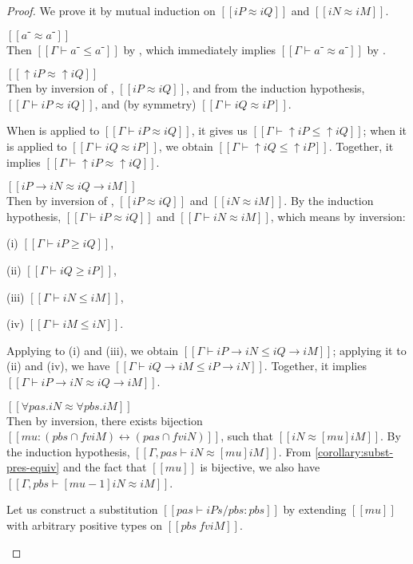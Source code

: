 \lemmaEquivSoundness*
\begin{proof}
  We prove it by mutual induction on $[[iP ≈ iQ]]$ and $[[iN ≈ iM]]$.
  \begin{caseof}
    \item $[[a⁻ ≈ a⁻]]$\\
      Then $[[Γ ⊢ a⁻ ≤ a⁻]]$ by ,
      which immediately implies $[[Γ ⊢ a⁻ ≈ a⁻]]$ by .

    \item $[[↑iP ≈ ↑iQ]]$\\
      Then by inversion of ,
      $[[iP ≈ iQ]]$, and from the induction hypothesis, $[[Γ ⊢ iP ≈ iQ]]$,
      and (by symmetry) $[[Γ ⊢ iQ ≈ iP]]$.

      When  is applied to $[[Γ ⊢ iP ≈ iQ]]$,
      it gives us $[[Γ ⊢ ↑iP ≤ ↑iQ]]$; when it is applied to $[[Γ ⊢ iQ ≈ iP]]$,
      we obtain $[[Γ ⊢ ↑iQ ≤ ↑iP]]$. Together, it implies $[[Γ ⊢ ↑iP ≈ ↑iQ]]$.

    \item $[[iP → iN ≈ iQ → iM]]$\\
      Then by inversion of ,
      $[[iP ≈ iQ]]$ and $[[iN ≈ iM]]$. By the induction hypothesis,
      $[[Γ ⊢ iP ≈ iQ]]$ and $[[Γ ⊢ iN ≈ iM]]$, which means by inversion:
      \begin{enumerate*}
        \item[(i)] $[[Γ ⊢ iP ≥ iQ]]$,
        \item[(ii)] $[[Γ ⊢ iQ ≥ iP]]$,
        \item[(iii)] $[[Γ ⊢ iN ≤ iM]]$,
        \item[(iv)]  $[[Γ ⊢ iM ≤ iN]]$.
      \end{enumerate*}
      Applying  to (i) and (iii), we obtain
      $[[Γ ⊢ iP → iN ≤ iQ → iM]]$; applying it to (ii) and (iv), we have $[[Γ ⊢
      iQ → iM ≤ iP → iN]]$. Together, it implies $[[Γ ⊢ iP → iN ≈ iQ → iM]]$.
    \item $[[∀pas.iN ≈ ∀pbs.iM]]$\\
      Then by inversion, there exists bijection $[[mu : ({pbs} ∩ fv iM) ↔ ({pas}
      ∩ fv iN)]]$, such that $[[iN ≈ [mu] iM]]$. By the induction hypothesis,
      $[[Γ, pas ⊢ iN ≈ [mu] iM]]$. From \cref{corollary:subst-pres-equiv} and
      the fact that $[[mu]]$ is bijective, we also have
      $[[Γ, pbs ⊢ [mu-1]iN ≈ iM]]$.

      Let us construct a substitution $[[{pas} ⊢ iPs/pbs : {pbs}]]$ by
      extending $[[mu]]$ with arbitrary positive types on $[[{pbs} \ fv iM]]$.


\end{caseof}
\end{proof}
